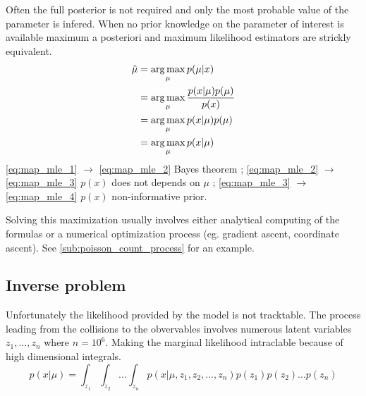 Often the full posterior is not required and only the most probable value of the parameter is infered.
When no prior knowledge on the parameter of interest is available maximum a posteriori and maximum likelihood estimators are strickly equivalent.
\begin{align}
	\label{eq:map_mle_1}
	\hat\mu &= \operatorname*{arg\,max}_\mu p(\mu | x) \\
	\label{eq:map_mle_2}
		&= \operatorname*{arg\,max}_\mu \frac{p(x|\mu) p(\mu)}{p(x)} \\
	\label{eq:map_mle_3}
		&= \operatorname*{arg\,max}_\mu p(x|\mu) p(\mu) \\
	\label{eq:map_mle_4}
		&= \operatorname*{arg\,max}_\mu p(x|\mu)\\
\end{align}
\autoref{eq:map_mle_1} $ \to$ \autoref{eq:map_mle_2} Bayes theorem ;
\autoref{eq:map_mle_2} $ \to$ \autoref{eq:map_mle_3} $p(x)$ does not depends on $\mu$ ;
\autoref{eq:map_mle_3} $ \to$ \autoref{eq:map_mle_4} $p(x)$ non-informative prior.

Solving this maximization usually involves either analytical computing of the formulas or a numerical optimization process (eg. gradient ascent, coordinate ascent).
See \autoref{sub:poisson_count_process} for an example.








\subsection{Inverse problem} %
\label{sub:inverse_problem}


Unfortunately the likelihood provided by the model is not tracktable.
The process leading from the collisions to the obvervables involves numerous latent variables $z_1, ..., z_n$ where $n=10^6$.
Making the marginal likelihood intraclable because of high dimensional integrals.
\begin{equation}
	\label{eq:intractable_integral}
	p(x|\mu) = \int_{z_1} \int_{z_2} ... \int_{z_n} p(x|\mu, z_1, z_2, ..., z_n) p(z_1) p(z_2) ... p(z_n)
\end{equation}


